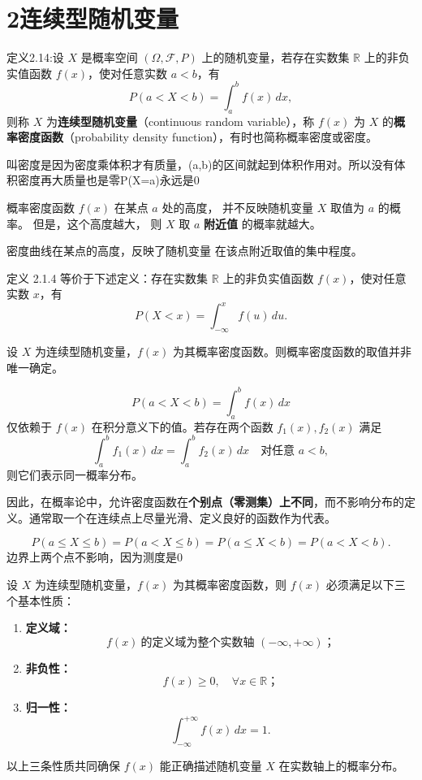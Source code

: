 \section{2连续型随机变量}
\begin{definition}[连续型随机变量与概率密度函数]
定义2.14:设 $X$ 是概率空间 $(\Omega, \mathcal{F}, P)$ 上的随机变量，若存在实数集 $\mathbb{R}$ 上的非负实值函数 $f(x)$，使对任意实数 $a<b$，有
\[
P(a < X < b) = \int_a^b f(x)\,dx, \tag{2.1.8}
\]
则称 $X$ 为\textbf{连续型随机变量}（continuous random variable），称 $f(x)$ 为 $X$ 的\textbf{概率密度函数}（probability density function），有时也简称概率密度或密度。
\end{definition}
\begin{dxtips}
    叫密度是因为密度乘体积才有质量，(a,b)的区间就起到体积作用对。所以没有体积密度再大质量也是零P(X=a)永远是0
\end{dxtips}
\begin{remark}

概率密度函数 $f(x)$ 在某点 $a$ 处的高度，
并不反映随机变量 $X$ 取值为 $a$ 的概率。
但是，这个高度越大，
则 $X$ 取 $a$ \textbf{附近值} 的概率就越大。

\vspace{6pt}
\textcolor{green!70!black}{
密度曲线在某点的高度，反映了随机变量
在该点附近取值的集中程度。
}
\end{remark}
\begin{proposition}[只有小于号另一端默认负无穷]
定义 2.1.4 等价于下述定义：存在实数集 $\mathbb{R}$ 上的非负实值函数 $f(x)$，使对任意实数 $x$，有
\[
P(X < x) = \int_{-\infty}^x f(u)\,du. \tag{2.1.9}
\]
\end{proposition}
\begin{proposition}[概率密度函数的非唯一性]
设 $X$ 为连续型随机变量，$f(x)$ 为其概率密度函数。则概率密度函数的取值并非唯一确定。

\[
P(a<X<b)=\int_a^b f(x)\,dx
\]
仅依赖于 $f(x)$ 在积分意义下的值。若存在两个函数 $f_1(x),f_2(x)$ 满足
\[
\int_a^b f_1(x)\,dx=\int_a^b f_2(x)\,dx
\quad\text{对任意 }a<b,
\]
则它们表示同一概率分布。

因此，在概率论中，允许密度函数在\textbf{个别点（零测集）上不同}，而不影响分布的定义。通常取一个在连续点上尽量光滑、定义良好的函数作为代表。
\end{proposition}
\[
P(a \le X \le b)
= P(a < X \le b)
= P(a \le X < b)
= P(a < X < b).
\]边界上两个点不影响，因为测度是0
\begin{theorem}[概率密度函数的性质]
设 $X$ 为连续型随机变量，$f(x)$ 为其概率密度函数，则 $f(x)$ 必须满足以下三个基本性质：
\begin{enumerate}
  \item[\textbf{(1)}] \textbf{定义域：}
  \[
  f(x)\ \text{的定义域为整个实数轴 } (-\infty,+\infty)；
  \]
  \item[\textbf{(2)}] \textbf{非负性：}
  \[
  f(x)\ge 0,\quad \forall x\in\mathbb{R}；
  \]
  \item[\textbf{(3)}] \textbf{归一性：}
  \[
  \int_{-\infty}^{+\infty} f(x)\,dx = 1.
  \]
\end{enumerate}
以上三条性质共同确保 $f(x)$ 能正确描述随机变量 $X$ 在实数轴上的概率分布。
\end{theorem}
